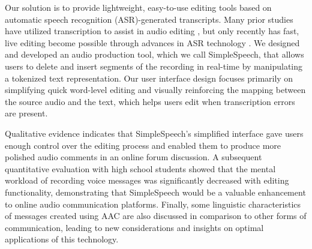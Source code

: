 Our solution is to provide lightweight, easy-to-use editing tools based on automatic speech recognition (ASR)-generated transcripts.
Many prior studies have utilized transcription to assist in audio editing \cite{casares,rubin,whittaker_semantic}, but only recently has fast, live editing become possible through advances in ASR technology \cite{baker,saon}.
We designed and developed an audio production tool, which we call SimpleSpeech, that allows users to delete and insert segments of the recording in real-time by manipulating a tokenized text representation. 
Our user interface design focuses primarily on simplifying quick word-level editing and visually reinforcing the mapping between the source audio and the text, which helps users edit when transcription errors are present.

Qualitative evidence indicates that SimpleSpeech's simplified interface gave users enough control over the editing process and enabled them to produce more polished audio comments in an online forum discussion.
A subsequent quantitative evaluation with high school students showed that the mental workload of recording voice messages was significantly decreased with editing functionality, demonstrating that SimpleSpeech would be a valuable enhancement to online audio communication platforms.
Finally, some linguistic characteristics of messages created using AAC are also discussed in comparison to other forms of communication, leading to new considerations and insights on optimal applications of this technology.
